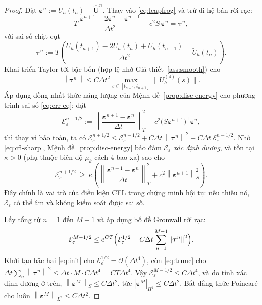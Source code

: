 \documentclass[11pt,a4paper]{article}
\theoremstyle{plain}
\theoremstyle{definition}
\theoremstyle{remark}
\newcommand{\Hone}{H^{1}}
\newcommand{\Ltwo}{L^{2}}
\newcommand{\dt}{\Delta t}
\newcommand{\norm}[1]{\left\lVert #1 \right\rVert}
\newcommand{\seminorm}[1]{\left\lvert #1 \right\rvert}
\newcommand{\Uvec}{\bm{U}}
\begin{document}
\begin{proof}
Đặt $\bm{\varepsilon}^{n} := U_{h}(t_{n}) - \hat{\Uvec}^{n}$. Thay vào
\eqref{eq:leapfrog} và trừ đi hệ bán rời rạc:
\begin{equation}
\label{eq:err-eq}
  T\,\frac{\bm{\varepsilon}^{n+1} - 2\bm{\varepsilon}^{n}
           + \bm{\varepsilon}^{n-1}}{\dt^{2}}
  + c^{2}S\,\bm{\varepsilon}^{n} = \bm{\tau}^{n},
\end{equation}
với sai số chặt cụt
\[
  \bm{\tau}^{n} := T\left(
     \frac{U_{h}(t_{n+1}) - 2U_{h}(t_{n}) + U_{h}(t_{n-1})}{\dt^{2}}
     - \ddot{U}_{h}(t_{n}) \right).
\]
Khai triển Taylor tới bậc bốn (hợp lệ nhờ Giả thiết~\ref{ass:smooth}) cho
\begin{equation}
\label{eq:trunc}
  \norm{\bm{\tau}^{n}} \le C\dt^{2}
     \max_{s \in [t_{n-1},t_{n+1}]}
     \bigl\lVert U_{h}^{(4)}(s) \bigr\rVert .
\end{equation}
Áp dụng đồng nhất thức năng lượng của Mệnh đề~\ref{prop:disc-energy} cho phương
trình sai số \eqref{eq:err-eq}: đặt
\[
  \mathcal{E}_{\varepsilon}^{n+1/2}
  := \left\lVert \frac{\bm{\varepsilon}^{n+1}-\bm{\varepsilon}^{n}}{\dt}
     \right\rVert_{T}^{2}
   + c^{2}\bigl(S\bm{\varepsilon}^{n+1}\bigr)^{\mathsf{T}}
     \bm{\varepsilon}^{n},
\]
thì thay vì bảo toàn, ta có
$\mathcal{E}_{\varepsilon}^{n+1/2} \le \mathcal{E}_{\varepsilon}^{n-1/2}
 + C\dt\,\norm{\bm{\tau}^{n}}^{2}
 + C\dt\,\mathcal{E}_{\varepsilon}^{n-1/2}$.
Nhờ \eqref{eq:cfl-sharp}, Mệnh đề~\ref{prop:disc-energy} bảo đảm
$\mathcal{E}_{\varepsilon}$ \emph{xác định dương}, và tồn tại
$\kappa > 0$ (phụ thuộc biên độ $\mu_{k}$ cách $4$ bao xa) sao cho
\[
  \mathcal{E}_{\varepsilon}^{n+1/2}
  \ \ge\ \kappa\left(
    \left\lVert \frac{\bm{\varepsilon}^{n+1}-\bm{\varepsilon}^{n}}{\dt}
    \right\rVert_{T}^{2}
    + c^{2}\norm{\bm{\varepsilon}^{n+1}}_{S}^{2} \right).
\]
Đây chính là vai trò của điều kiện CFL trong chứng minh hội tụ: nếu thiếu
nó, $\mathcal{E}_{\varepsilon}$ có thể âm và không kiểm soát được sai số.

Lấy tổng từ $n = 1$ đến $M-1$ và áp dụng bổ đề Gronwall rời rạc:
\[
  \mathcal{E}_{\varepsilon}^{M-1/2}
  \le e^{CT}\Bigl( \mathcal{E}_{\varepsilon}^{1/2}
      + C\dt\sum_{n=1}^{M-1}\norm{\bm{\tau}^{n}}^{2} \Bigr).
\]
Khởi tạo bậc hai \eqref{eq:init} cho
$\mathcal{E}_{\varepsilon}^{1/2} = \mathcal{O}(\dt^{4})$, còn
\eqref{eq:trunc} cho
$\dt\sum_{n}\norm{\bm{\tau}^{n}}^{2}
 \le \dt \cdot M \cdot C\dt^{4} = CT\dt^{4}$.
Vậy $\mathcal{E}_{\varepsilon}^{M-1/2} \le C\dt^{4}$, và do tính xác định
dương ở trên,
$\norm{\bm{\varepsilon}^{M}}_{S} \le C\dt^{2}$, tức
$\seminorm{\bm{\varepsilon}^{M}}_{\Hone} \le C\dt^{2}$. Bất đẳng thức
Poincaré cho luôn $\norm{\bm{\varepsilon}^{M}}_{\Ltwo} \le C\dt^{2}$.
\end{proof}
\end{document}
